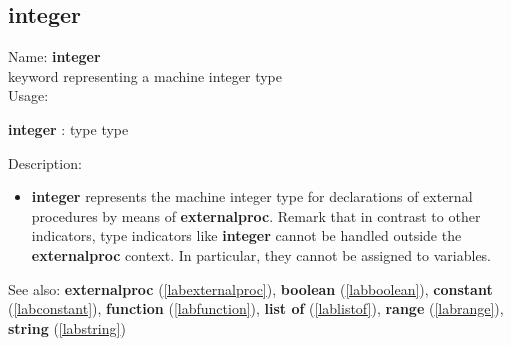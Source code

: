 \subsection{integer}
\label{labinteger}
\noindent Name: \textbf{integer}\\
keyword representing a machine integer type \\

\noindent Usage: 
\begin{center}
\textbf{integer} : \textsf{type type}\\
\end{center}
\noindent Description: \begin{itemize}

\item \textbf{integer} represents the machine integer type for declarations
   of external procedures by means of \textbf{externalproc}.
   Remark that in contrast to other indicators, type indicators like
   \textbf{integer} cannot be handled outside the \textbf{externalproc} context.  In
   particular, they cannot be assigned to variables.
\end{itemize}
See also: \textbf{externalproc} (\ref{labexternalproc}), \textbf{boolean} (\ref{labboolean}), \textbf{constant} (\ref{labconstant}), \textbf{function} (\ref{labfunction}), \textbf{list of} (\ref{lablistof}), \textbf{range} (\ref{labrange}), \textbf{string} (\ref{labstring})
